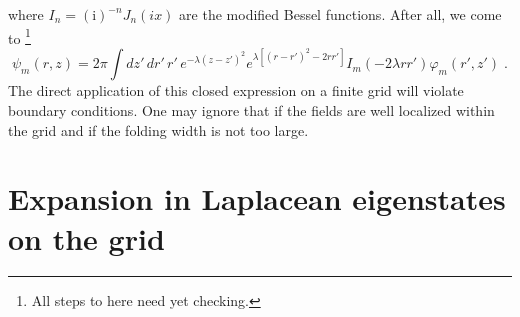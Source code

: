 \documentclass[12pt]{article}
\begin{document}
where $I_n=(\mathrm{i})^{-n}J_n(ix)$ are the modified Bessel functions. After all, we come to
\footnote{All steps to here need yet checking.}
\begin{equation}
  \psi_m(r,z)
  =
  2\pi\int dz'\,dr'\,r'\,e^{-\lambda(z-z')^2} e^{\lambda[(r-r')^2-2rr']}I_m(-2\lambda rr')  \varphi_m(r',z')
  \;.
\end{equation}
The direct application of this closed expression on a finite grid will
violate boundary conditions. One may ignore that if the fields are
well localized within the grid and if the folding width is not too
large. 

\section{Expansion in Laplacean eigenstates on the grid}
\end{document}
